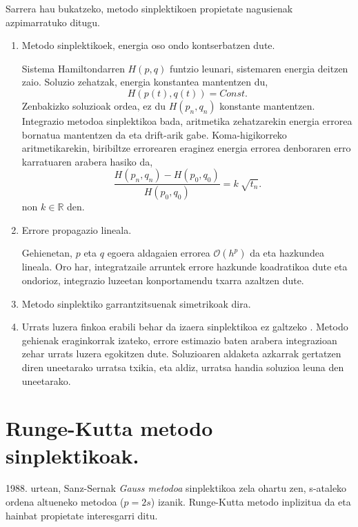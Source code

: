 Sarrera hau bukatzeko, metodo sinplektikoen propietate nagusienak azpimarratuko ditugu.
\begin{enumerate}

\item Metodo sinplektikoek, energia oso ondo kontserbatzen dute.

Sistema Hamiltondarren $H(p,q)$ funtzio leunari, sistemaren energia deitzen zaio. Soluzio zehatzak, energia konstantea mantentzen du,
\begin{equation*}
H(p(t),q(t))=Const.
\end{equation*}
Zenbakizko soluzioak ordea, ez du $H(p_n,q_n)$  konstante mantentzen. Integrazio metodoa sinplektikoa bada, aritmetika zehatzarekin energia errorea bornatua mantentzen da eta drift-arik gabe. Koma-higikorreko aritmetikarekin, biribiltze errorearen eraginez energia errorea denboraren erro karratuaren arabera hasiko da,
\begin{equation*}
\frac{H(p_n,q_n)-H(p_0,q_0)}{H(p_0,q_0)}=k \ \sqrt{t_n}.
\end{equation*}
non $k\in \mathbb{R}$ den.

\item Errore propagazio lineala.

Gehienetan, $p$ eta $q$ egoera aldagaien errorea $\mathcal{O}(h^p)$ da eta hazkundea lineala. Oro har, integratzaile arruntek errore hazkunde koadratikoa dute eta ondorioz, integrazio luzeetan konportamendu txarra azaltzen dute.

\item Metodo sinplektiko garrantzitsuenak simetrikoak dira.

\item Urrats luzera finkoa erabili behar da izaera sinplektikoa ez galtzeko \cite{JMSanz-Serna1994}.  Metodo gehienak eraginkorrak izateko, errore estimazio baten arabera integrazioan zehar urrats luzera egokitzen dute. Soluzioaren aldaketa azkarrak gertatzen diren uneetarako urratsa txikia, eta aldiz, urratsa handia soluzioa leuna den uneetarako.   

\end{enumerate} 

\section{Runge-Kutta metodo sinplektikoak.}


1988. urtean, Sanz-Sernak \emph{Gauss metodoa} sinplektikoa zela ohartu zen, s-ataleko ordena altueneko metodoa ($p=2s$) izanik. Runge-Kutta metodo inplizitua da eta hainbat propietate interesgarri ditu. 

